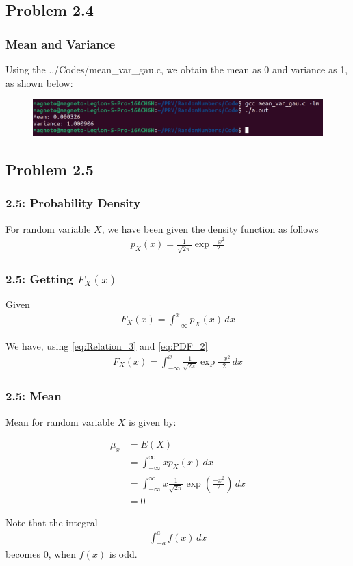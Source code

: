 \documentclass{beamer}
\begin{document}
\subsection{Problem 2.4}
\begin{frame}
	\frametitle{Mean and Variance}
	Using the ../Codes/mean\_var\_gau.c, we obtain the mean as 0 and variance as 1, as shown below:
	\begin{figure}
		\centerline{\includegraphics[width=\textheight]{../figs/screen2.png}}
		\label{fig5}
	\end{figure}	
\end{frame}

\subsection{Problem 2.5}
\begin{frame}
	\frametitle{2.5: Probability Density}
	For random variable $X$, we have been given the density function as follows
	\begin{align}
		p_X(x) = \frac{1}{\sqrt{2\pi}}\exp{\frac{-x^2}{2}} 
		\label{eq:PDF_2}
	\end{align}
\end{frame}

\begin{frame}
	\frametitle{2.5: Getting $F_X(x)$}

	Given
	\begin{align}
		F_X(x) = \int_{-\infty}^{x} p_X(x) \,dx
		\label{eq:Relation_3}
	\end{align}

	We have, using 
	\eqref{eq:Relation_3} and 
	\eqref{eq:PDF_2}
	\begin{align}
		F_X(x) = \int_{-\infty}^{x} \frac{1}{\sqrt{2\pi}}\exp{\frac{-x^2}{2}} \,dx
	\end{align}

\end{frame}

\begin{frame}
	\frametitle{2.5: Mean}
	Mean for random variable $X$ is given by:
	
	\begin{align}
		\mu_x &= E(X) \\
		&= \int^{\infty}_{-\infty} x p_X(x) \,dx \\
		&= \int^{\infty}_{-\infty} x \frac{1}{\sqrt{2\pi}}\exp{\left(\frac{-x^2}{2}\right)} \,dx \\
		&= 0
	\end{align}

	Note that the integral
	\begin{align}
		\int^a_{-a} f(x) \,dx
	\end{align}
	becomes 0, when $f(x)$ is odd.

\end{frame}
\end{document}
